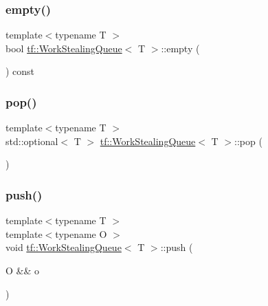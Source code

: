 \mbox{\label{classtf_1_1WorkStealingQueue_adc85682657a3cd6c0fe87a71d350036c}} 
\subsubsection{\texorpdfstring{empty()}{empty()}}
{\footnotesize\ttfamily template$<$typename T $>$ \\
bool \hyperlink{classtf_1_1WorkStealingQueue}{tf\+::\+Work\+Stealing\+Queue}$<$ T $>$\+::empty (\begin{DoxyParamCaption}{ }\end{DoxyParamCaption}) const\hspace{0.3cm}{\ttfamily [noexcept]}}

\mbox{\label{classtf_1_1WorkStealingQueue_a1ba75ce446b149de97e62310851a243d}} 
\subsubsection{\texorpdfstring{pop()}{pop()}}
{\footnotesize\ttfamily template$<$typename T $>$ \\
std\+::optional$<$ T $>$ \hyperlink{classtf_1_1WorkStealingQueue}{tf\+::\+Work\+Stealing\+Queue}$<$ T $>$\+::pop (\begin{DoxyParamCaption}{ }\end{DoxyParamCaption})}

\mbox{\label{classtf_1_1WorkStealingQueue_a0d2632d5fbff766101df431b365790c0}} 
\subsubsection{\texorpdfstring{push()}{push()}}
{\footnotesize\ttfamily template$<$typename T $>$ \\
template$<$typename O $>$ \\
void \hyperlink{classtf_1_1WorkStealingQueue}{tf\+::\+Work\+Stealing\+Queue}$<$ T $>$\+::push (\begin{DoxyParamCaption}\item[{O \&\&}]{o }\end{DoxyParamCaption})}

